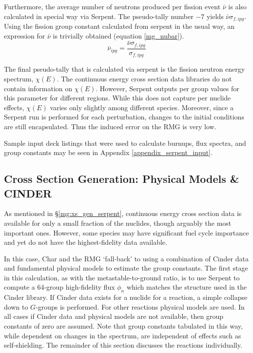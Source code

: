 Furthermore, the average number of neutrons produced per fission event $\bar{\nu}$ is also 
calculated in special way via Serpent.  The pseudo-tally number $-7$ yields $\bar{\nu}\sigma_{f,ipg}$.
Using the fission group constant calculated from serpent in the usual way, an expression for $\bar{\nu}$
is trivially obtained (equation \ref{mg_nubar}).
\begin{equation}
\label{mg_nubar}
\bar{\nu}_{ipg} = \frac{\bar{\nu}\sigma_{f,ipg}}{\sigma_{f,ipg}}
\end{equation}

The final pseudo-tally that is calculated via serpent is the fission neutron energy spectrum, $\chi(E)$.
The continuous energy cross section data libraries do not contain information on $\chi(E)$.  However, 
Serpent outputs per group values for this parameter for different regions.  While this does not 
capture per nuclide effects, $\chi(E)$ varies only slightly among different species.  
Moreover, since a Serpent run is performed for each perturbation, changes to 
the initial conditions are still encapsulated.  Thus the induced error on the RMG is very low.

Sample input deck listings that were used to calculate burnups, flux spectra, and group constants
may be seen in Appendix \ref{appendix_serpent_input}.

\subsection{Cross Section Generation: Physical Models \& CINDER}
\label{mg:xs_gen_physics}
As mentioned in \S \ref{mg:xs_gen_serpent}, continuous energy cross section data is available for only 
a small fraction of the nuclides, though arguably the most important ones.  However, some species 
may have significant fuel cycle importance and yet do not have the highest-fidelity data available.

In this case, Char and the RMG `fall-back' to using a combination of Cinder data and fundamental 
physical models to estimate the group constants. The first stage in this calculation, as with the 
metastable-to-ground ratio, is to use Serpent to compute a 64-group high-fidelity flux $\phi_n$
which matches the structure used in the Cinder library.  If Cinder data exists for a nuclide for 
a reaction, a simple collapse down to $G$-groups is performed.  For other reactions physical
models are used.  In all cases if Cinder data and physical models are not available, then group
constants of zero are assumed.  Note that group constants tabulated in this way, while dependent 
on changes in the spectrum, are independent of effects such as self-shielding.
The remainder of this section discusses the reactions individually.

